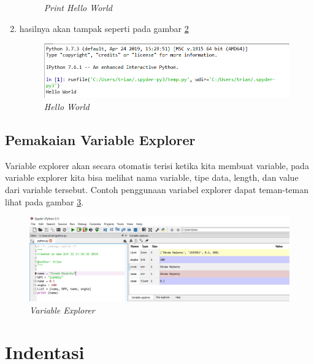 \begin{enumerate}
\begin{figure}[!htbp]
    \caption{\textit{Print Hello World}}
    \label{Print Hello World}
\end{figure}
\item hasilnya akan tampak seperti pada gambar \ref{Hello World}
\begin{figure}[!htbp]
    \centering
    \includegraphics[scale=0.75]{figures/run}
    \caption{\textit{Hello World}}
    \label{Hello World}
\end{figure}
\end{enumerate}

\subsection{Pemakaian Variable Explorer}
Variable explorer akan secara otomatis terisi ketika kita membuat variable, pada variable explorer kita bisa melihat nama variable, tipe data, length, dan value dari variable tersebut. Contoh penggunaan variabel explorer dapat teman-teman lihat pada gambar \ref{Variable Explorer}.
\begin{figure}[!htbp]
    \centering
    \includegraphics[scale=0.4]{figures/variable}
    \caption{\textit{Variable Explorer}}
    \label{Variable Explorer}
\end{figure}

\section{Indentasi}
